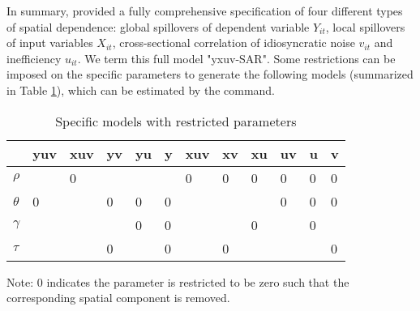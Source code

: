 In summary, \cite{galli2022spatial} provided a fully comprehensive specification of four different types of spatial dependence: global spillovers of dependent variable $Y_{it}$, local spillovers of input variables $X_{it}$, cross-sectional correlation of idiosyncratic noise  $v_{it}$ and inefficiency $u_{it}$. We term this full model "yxuv-SAR". Some restrictions can be imposed on the specific parameters to generate the following  models (summarized in Table \ref{Tab01}), which can be estimated by the  command.


\begin{table}[htbp]
	
	\centering
	
	\caption{Specific  models with restricted parameters}
	
	\label{Tab01}
	\begin{threeparttable}
	\begin{tabular}{@{}llllllllllll@{}}
		\toprule
		 & yuv & xuv & yv & yu & y & xuv & xv & xu & uv & u & v  \\ \midrule
		$\rho$   &     & 0   &    &    &   & 0   & 0  & 0  & 0  & 0 & 0 \\
		$\theta$ & 0   &     & 0  & 0  & 0 &     &    &    & 0  & 0 & 0 \\
		$\gamma$ &     &     &    & 0  & 0 &     &    & 0  &    & 0 &   \\
		$\tau$   &     &     & 0  &    & 0 &     & 0  &    &    &   & 0 \\ \bottomrule
	\end{tabular}
	\begin{tablenotes}
		\footnotesize
		\item Note: 0 indicates the parameter is restricted to be zero such that the corresponding spatial component is removed.
	\end{tablenotes}
\end{threeparttable}
\end{table}



\endinput
